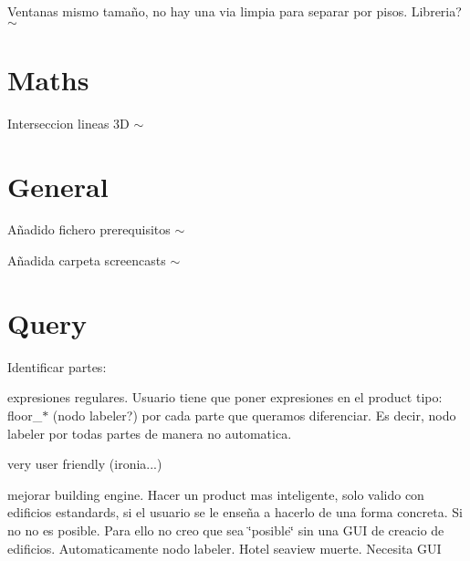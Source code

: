 
\begin{DoxyItemize}
\item Ventanas mismo tamaño, no hay una via limpia para separar por pisos. Libreria? $\sim$ \section*{Maths}
\end{DoxyItemize}


\begin{DoxyItemize}
\item Interseccion lineas 3\-D $\sim$
\end{DoxyItemize}

\section*{General}


\begin{DoxyItemize}
\item Añadido fichero prerequisitos $\sim$
\item Añadida carpeta screencasts $\sim$
\end{DoxyItemize}

\section*{Query}


\begin{DoxyItemize}
\item Identificar partes\-:


\begin{DoxyItemize}
\item expresiones regulares. Usuario tiene que poner expresiones en el product tipo\-: floor\-\_\-$\ast$ (nodo labeler?) por cada parte que queramos diferenciar. Es decir, nodo labeler por todas partes de manera no automatica.
\end{DoxyItemize}
\end{DoxyItemize}

very user friendly (ironia...)


\begin{DoxyItemize}
\item mejorar building engine. Hacer un product mas inteligente, solo valido con edificios estandards, si el usuario se le enseña a hacerlo de una forma concreta. Si no no es posible. Para ello no creo que sea \char`\"{}posible\char`\"{} sin una G\-U\-I de creacio de edificios. Automaticamente nodo labeler. Hotel seaview muerte. Necesita G\-U\-I
\end{DoxyItemize}


